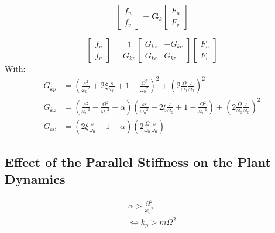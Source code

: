 \documentclass{ISMA_USD2020}
\begin{document}
\begin{equation}
\begin{bmatrix} f_u \\ f_v \end{bmatrix} =
\bm{G}_k
\begin{bmatrix} F_u \\ F_v \end{bmatrix}
\end{equation}

\begin{equation}
\begin{bmatrix} f_u \\ f_v \end{bmatrix} =
\frac{1}{G_{kp}}
\begin{bmatrix}
   G_{kz} & -G_{kc} \\
   G_{kc} &  G_{kz}
\end{bmatrix}
\begin{bmatrix} F_u \\ F_v \end{bmatrix}
\end{equation}
With:
\begin{subequations}
  \begin{align}
    G_{kp} &= \left( \frac{s^2}{{\omega_0}^2} + 2\xi \frac{s}{\omega_0} + 1 - \frac{\Omega^2}{{\omega_0}^2} \right)^2 + \left( 2 \frac{\Omega}{\omega_0}\frac{s}{\omega_0} \right)^2 \\
    G_{kz} &= \left( \frac{s^2}{{\omega_0}^2} - \frac{\Omega^2}{{\omega_0}^2} + \alpha \right) \left( \frac{s^2}{{\omega_0}^2} + 2\xi \frac{s}{\omega_0} + 1 - \frac{\Omega^2}{{\omega_0}^2} \right) + \left( 2 \frac{\Omega}{\omega_0}\frac{s}{\omega_0} \right)^2 \\
    G_{kc} &= \left( 2 \xi \frac{s}{\omega_0} + 1 - \alpha \right) \left( 2 \frac{\Omega}{\omega_0}\frac{s}{\omega_0} \right)
  \end{align}
\end{subequations}

\subsection{Effect of the Parallel Stiffness on the Plant Dynamics}
\label{sec:orge20adc9}
\begin{equation}
  \begin{align}
    \alpha > \frac{\Omega^2}{{\omega_0}^2} \\
    \Leftrightarrow k_p > m \Omega^2
  \end{align}
\end{equation}
\end{document}
